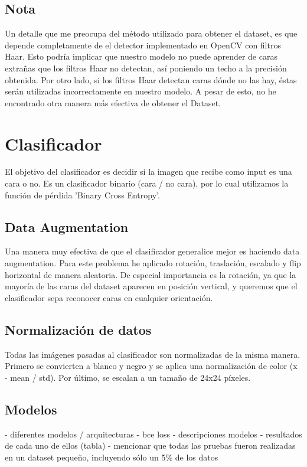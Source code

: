 \documentclass[a4paper, 11pt]{article}
\begin{document}
		\subsection{Nota}
		Un detalle que me preocupa del método utilizado para obtener el dataset, es que depende completamente de el detector implementado en OpenCV con filtros Haar. Esto podría implicar que nuestro modelo no puede aprender de caras extrañas que los filtros Haar no detectan, así poniendo un techo a la precisión obtenida. Por otro lado, si los filtros Haar detectan caras dónde no las hay, éstas serán utilizadas incorrectamente en nuestro modelo. A pesar de esto, no he encontrado otra manera más efectiva de obtener el Dataset.
	\section{Clasificador}
		El objetivo del clasificador\cite{classifier-training} es decidir si la imagen que recibe como input es una cara o no. Es un clasificador binario (cara / no cara), por lo cual utilizamos la función de pérdida 'Binary Cross Entropy'.
		
		\subsection{Data Augmentation}
			Una manera muy efectiva de que el clasificador generalice mejor es haciendo data augmentation. Para este problema he aplicado rotación, traslación, escalado y flip horizontal de manera aleatoria. De especial importancia es la rotación, ya que la mayoría de las caras del dataset aparecen en posición vertical, y queremos que el clasificador sepa reconocer caras en cualquier orientación.
			
		\subsection{Normalización de datos}
			Todas las imágenes pasadas al clasificador son normalizadas de la misma manera. Primero se convierten a blanco y negro y se aplica una normalización de color (x - mean / std). Por último, se escalan a un tamaño de 24x24 píxeles.

		\subsection{Modelos}
			
	- diferentes modelos / arquitecturas
		- bce loss
		- descripciones modelos
		- resultados de cada uno de ellos (tabla)
			- mencionar que todas las pruebas fueron realizadas en un dataset pequeño, incluyendo sólo un 5\% de los datos
			
\end{document}
